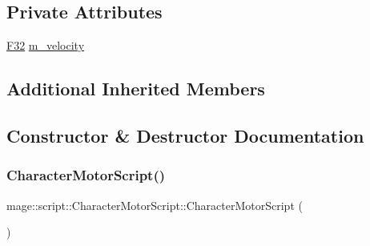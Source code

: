 \subsection*{Private Attributes}
\begin{DoxyCompactItemize}
\item 
\hyperlink{namespacemage_aa97e833b45f06d60a0a9c4fc22ae02c0}{F32} \hyperlink{classmage_1_1script_1_1_character_motor_script_a30db45f04bc56380729af037e71ff237}{m\+\_\+velocity}
\end{DoxyCompactItemize}
\subsection*{Additional Inherited Members}


\subsection{Constructor \& Destructor Documentation}
\hypertarget{classmage_1_1script_1_1_character_motor_script_ac5147e7eca438fe01cc0bedb2ce0a750}{}\label{classmage_1_1script_1_1_character_motor_script_ac5147e7eca438fe01cc0bedb2ce0a750} 
\subsubsection{\texorpdfstring{Character\+Motor\+Script()}{CharacterMotorScript()}\hspace{0.1cm}{\footnotesize\ttfamily [1/3]}}
{\footnotesize\ttfamily mage\+::script\+::\+Character\+Motor\+Script\+::\+Character\+Motor\+Script (\begin{DoxyParamCaption}{ }\end{DoxyParamCaption})}

\hypertarget{classmage_1_1script_1_1_character_motor_script_a22c2bc0693a38f12182234ba842aa6f2}{}\label{classmage_1_1script_1_1_character_motor_script_a22c2bc0693a38f12182234ba842aa6f2} 
